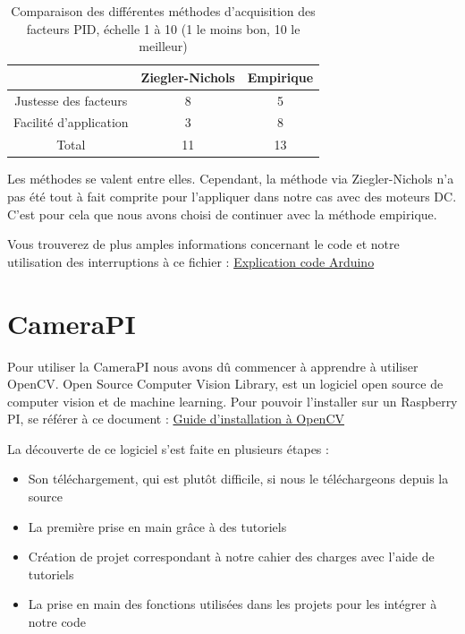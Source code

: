 \documentclass[
	a4paper,									%
	11pt,										%
	twoside,									%
	openright,									%
	notitlepage,									%
	parskip=half,								%
]{scrreprt}										%
\begin{document}
\begin{table}[!ht]
    \begin{center}
        \vspace{5mm}
        \label{tab:table5}
        \begin{tabular}{c|c|c} %
            \toprule
            \textbf{ } & \textbf{Ziegler-Nichols} & \textbf{Empirique}\\
            \midrule
            Justesse des facteurs & 8 & 5\\
            Facilité d'application & 3 & 8\\
            \midrule
			Total & 11 & 13\\
            \bottomrule
        \end{tabular}
    \end{center}    
	\caption{Comparaison des différentes méthodes d'acquisition des facteurs PID, échelle 1 à 10 (1 le moins bon, 10 le meilleur)}
\end{table}

Les méthodes se valent entre elles. Cependant, la méthode via Ziegler-Nichols n'a pas été tout à fait comprite pour l'appliquer 
dans notre cas avec des moteurs DC. C'est pour cela que nous avons choisi de continuer avec la méthode empirique. \par


Vous trouverez de plus amples informations concernant le code et notre utilisation des interruptions
à ce fichier : \href{run:./Code_Arduino.pdf}{Explication code Arduino}



\section{CameraPI}

Pour utiliser la CameraPI nous avons dû commencer à apprendre à utiliser OpenCV. 
Open Source Computer Vision Library, est un logiciel open source de computer vision et de machine learning. 
Pour pouvoir l'installer sur un Raspberry PI, se référer à ce document : \href{run:./Installation_OpenCV.pdf}{Guide d'installation à OpenCV}\par

La découverte de ce logiciel s'est faite en plusieurs étapes : 

\begin{itemize}
	\item Son téléchargement, qui est plutôt difficile, si nous le téléchargeons depuis la source
	\item La première prise en main grâce à des tutoriels
	\item Création de projet correspondant à notre cahier des charges avec l'aide de tutoriels
	\item La prise en main des fonctions utilisées dans les projets pour les intégrer à notre code
\end{itemize}
\end{document}

